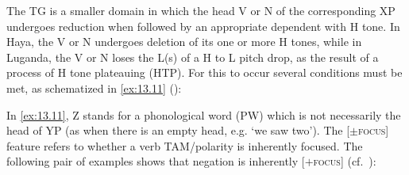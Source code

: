 \documentclass[output=paper]{langsci/langscibook}
\begin{document}
The \gls{TG} is a smaller domain in which the head V or N of the corresponding
XP undergoes reduction when followed by an appropriate dependent with H tone.
In Haya, the V or N undergoes deletion of its one or more H tones, while in
Luganda, the V or N loses the L(s) of a H to L pitch drop, as the result of a
process of H tone plateauing (\gls{HTP}). For this to occur
several conditions must be met, as schematized in \eqref{ex:13.11}
(\citealt[75]{HymanKatamba2010}):

\begin{exe}
    \ex\label{ex:13.11} 
\end{exe}
In \eqref{ex:13.11}, Z stands for a phonological word (\gls{PW})
which is not necessarily the head of YP (as when there is an empty head, e.g.
‘we saw two’).  The [$\pm$\textsc{focus}] feature refers to whether a verb
\gls{TAM}/polarity is inherently focused. The following pair of examples shows
that negation is inherently [$+$\textsc{focus}] (cf.\ \citealt{HymanWatters1984}):
\end{document}
